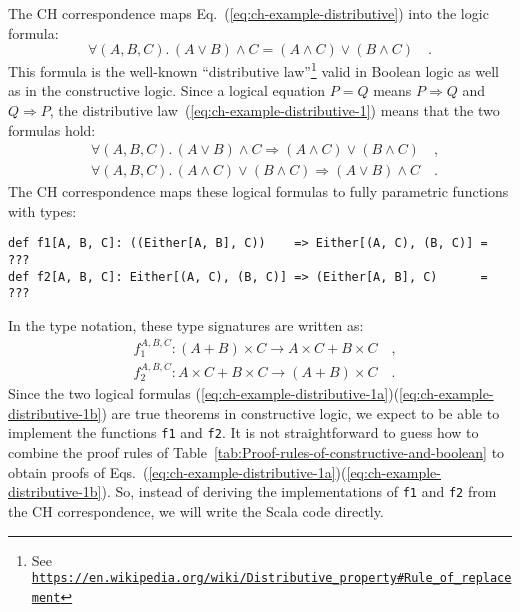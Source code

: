 The CH correspondence maps Eq.~(\ref{eq:ch-example-distributive})
into the logic formula:
\begin{equation}
\forall(A,B,C).\,\left(A\vee B\right)\wedge C=\left(A\wedge C\right)\vee\left(B\wedge C\right)\quad.\label{eq:ch-example-distributive-1}
\end{equation}
This formula is the well-known \textsf{``}distributive law\textsf{''}\footnote{See \texttt{\href{https://en.wikipedia.org/wiki/Distributive_property\#Rule_of_replacement}{https://en.wikipedia.org/wiki/Distributive\_property\#Rule\_of\_replacement}}}
valid in Boolean logic as well as in the constructive logic. Since
a logical equation $P=Q$ means $P\Rightarrow Q$ and $Q\Rightarrow P$,
the distributive law~(\ref{eq:ch-example-distributive-1}) means
that the two formulas hold:
\begin{align}
 & \forall(A,B,C).\,\left(A\vee B\right)\wedge C\Rightarrow\left(A\wedge C\right)\vee\left(B\wedge C\right)\quad,\label{eq:ch-example-distributive-1a}\\
 & \forall(A,B,C).\,\left(A\wedge C\right)\vee\left(B\wedge C\right)\Rightarrow\left(A\vee B\right)\wedge C\quad.\label{eq:ch-example-distributive-1b}
\end{align}
The CH correspondence maps these logical formulas to fully parametric
functions with types:
\begin{lstlisting}
def f1[A, B, C]: ((Either[A, B], C))    => Either[(A, C), (B, C)] = ???
def f2[A, B, C]: Either[(A, C), (B, C)] => (Either[A, B], C)      = ???
\end{lstlisting}
In the type notation, these type signatures are written as:
\begin{align*}
 & f_{1}^{A,B,C}:\left(A+B\right)\times C\rightarrow A\times C+B\times C\quad,\\
 & f_{2}^{A,B,C}:A\times C+B\times C\rightarrow\left(A+B\right)\times C\quad.
\end{align*}
Since the two logical formulas (\ref{eq:ch-example-distributive-1a})\textendash (\ref{eq:ch-example-distributive-1b})
are true theorems in constructive logic, we expect to be able to implement
the functions \lstinline!f1! and \lstinline!f2!. It is not straightforward
to guess how to combine the proof rules of Table~\ref{tab:Proof-rules-of-constructive-and-boolean}
to obtain proofs of Eqs.~(\ref{eq:ch-example-distributive-1a})\textendash (\ref{eq:ch-example-distributive-1b}).
So, instead of deriving the implementations of \lstinline!f1! and
\lstinline!f2! from the CH correspondence, we will write the Scala
code directly.


